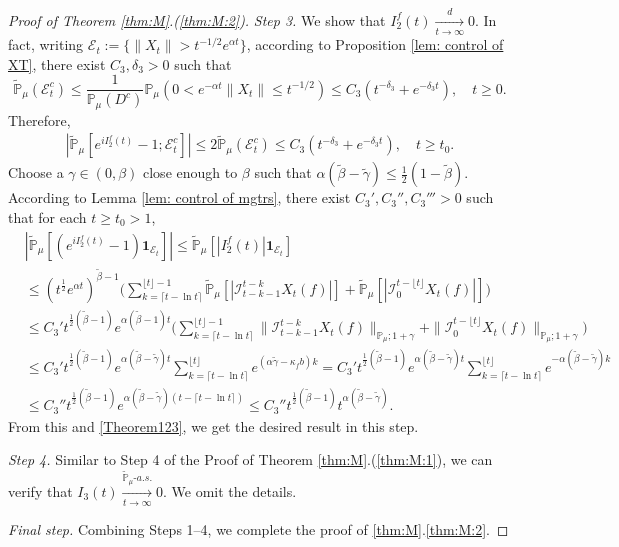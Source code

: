\documentclass[12pt,a4paper]{amsart}
\theoremstyle{plain}
\theoremstyle{definition}
\numberwithin{equation}{section}
\begin{document}
\begin{proof}[Proof of Theorem \ref{thm:M}.(\ref{thm:M:2})]
  \emph{Step 3.}
  We show that $ I^f_2(t)\xrightarrow[t\to \infty]{d} 0$.
  In fact, writing $\mathcal{E}_t:=\{\|X_t\|>t^{-1/2}e^{\alpha t}\}$, according to Proposition \ref{lem: control of XT}, there exist $C_3, \delta_3>0$ such that
  \[
    \mathbb{\widetilde{P}}_{\mu}(\mathcal{E}^c_t)
    \leq \frac{1}{\mathbb{P}_{\mu}(D^c)}\mathbb{P}_{\mu}(0<e^{-\alpha t}\|X_t\|\leq t^{-1/2})\leq C_3( t^{-\delta_3}+e^{-\delta_3 t})
    , \quad t\geq0.
  \]
  Therefore,
  \begin{align}
    \label{Theorem123}
    |\mathbb{\widetilde{P}}_{\mu}[e^{i I^f_2(t)}-1;\mathcal{E}^c_t]|
    \leq 2\mathbb{\widetilde{P}}_{\mu}(\mathcal{E}^c_t)
    \leq C_3(t^{-\delta_3}+e^{-\delta_3 t}),
    \quad t\geq t_0.
  \end{align}
  Choose a $\gamma\in (0,\beta)$ close enough to $\beta$ such that $\alpha(\tilde \beta - \tilde \gamma) \leq \frac{1}{2}(1- \tilde \beta)$.
	According to Lemma \ref{lem: control of mgtrs}, there exist $C_3',C_3'',C_3'''>0$ such that for each $t\geq t_0 >1$,
  \begin{align}
    & |\mathbb{\widetilde{P}}_{\mu} [ (e^{i I^f_2(t)}-1)\mathbf{1}_{\mathcal{E}_t}]|
      \leq  \mathbb{\widetilde{P}}_{\mu} [ |I^f_2(t)|\mathbf{1}_{\mathcal{E}_t}] \\
    & \leq  (t^{\frac{1}{2}} e^{\alpha t} )^{\tilde \beta - 1}\Big(\sum_{k=\lceil t-\ln t \rceil}^{\lfloor t \rfloor - 1}\mathbb{\widetilde{P}}_{\mu} [| \mathcal{I}_{t-k-1}^{t-k} X_t(f) |] + \mathbb{\widetilde{P}}_{\mu}[| \mathcal{I}_{0}^{t-\lfloor t\rfloor} X_t(f)|]\Big) \\
    & \leq C_3' t^{\frac{1}{2}(\tilde \beta - 1)} e^{\alpha(\tilde \beta - 1)t}\Big(\sum_{k=\lceil t-\ln t \rceil}^{\lfloor t \rfloor - 1}\|\mathcal{I}_{t-k-1}^{t-k} X_t(f) \|_{\mathbb P_\mu; 1+\gamma} + \|\mathcal I_0^{t-\lfloor t \rfloor} X_t(f)\|_{\mathbb P_\mu;1+\gamma}\Big) \\
    & \leq C_3' t^{\frac{1}{2}(\tilde \beta - 1)} e^{\alpha (\tilde \beta - \tilde \gamma)t}\sum_{k=\lceil t-\ln t \rceil}^{\lfloor t \rfloor}  e^{(\alpha\tilde \gamma-\kappa_f b)k}
      = C_3' t^{\frac{1}{2}(\tilde \beta - 1)} e^{\alpha(\tilde \beta - \tilde \gamma) t}\sum_{k=\lceil t-\ln t \rceil}^{\lfloor t \rfloor}  e^{-\alpha (\tilde \beta -\tilde \gamma) k}
    \\ & \leq C_3'' t^{\frac{1}{2}(\tilde \beta - 1)} e^{\alpha (\tilde \beta - \tilde \gamma)(t - \lceil t - \ln t\rceil)}
         \leq C_3'' t^{\frac{1}{2}(\tilde \beta - 1)} t^{\alpha (\tilde \beta - \tilde \gamma)}.
  \end{align}
  From this and \eqref{Theorem123}, we get the desired result in this step.

  \emph{Step 4.} Similar to Step 4 of the Proof of Theorem \ref{thm:M}.(\ref{thm:M:1}), we can verify that $I_3(t) \xrightarrow[t\to \infty]{\widetilde {\mathbb P}_\mu \text{-} a.s.} 0$.
  We omit the details.

 	\emph{Final step.} Combining Steps 1--4, we complete the proof of \ref{thm:M}.\eqref{thm:M:2}.
\end{proof}
\end{document}
